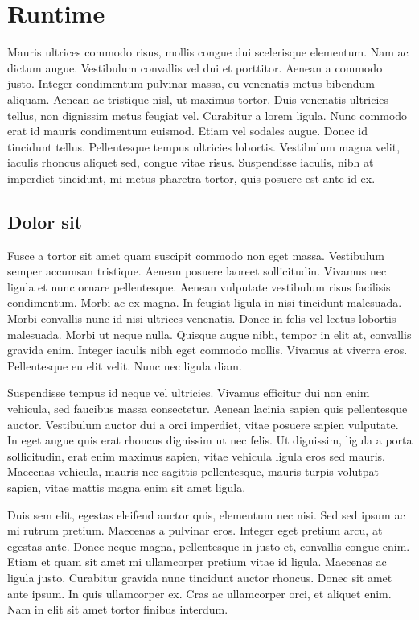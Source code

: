 \section{Runtime}
\label{sec:ipsum}
Mauris ultrices commodo risus, mollis congue dui scelerisque elementum. Nam ac dictum augue. Vestibulum convallis vel dui et porttitor. Aenean a commodo justo. Integer condimentum pulvinar massa, eu venenatis metus bibendum aliquam. Aenean ac tristique nisl, ut maximus tortor. Duis venenatis ultricies tellus, non dignissim metus feugiat vel. Curabitur a lorem ligula. Nunc commodo erat id mauris condimentum euismod. Etiam vel sodales augue. Donec id tincidunt tellus. Pellentesque tempus ultricies lobortis. Vestibulum magna velit, iaculis rhoncus aliquet sed, congue vitae risus. Suspendisse iaculis, nibh at imperdiet tincidunt, mi metus pharetra tortor, quis posuere est ante id ex.

\subsection{Dolor sit} %
\label{sub:dolor_sit}
Fusce a tortor sit amet quam suscipit commodo non eget massa. Vestibulum semper accumsan tristique. Aenean posuere laoreet sollicitudin. Vivamus nec ligula et nunc ornare pellentesque. Aenean vulputate vestibulum risus facilisis condimentum. Morbi ac ex magna. In feugiat ligula in nisi tincidunt malesuada. Morbi convallis nunc id nisi ultrices venenatis. Donec in felis vel lectus lobortis malesuada. Morbi ut neque nulla. Quisque augue nibh, tempor in elit at, convallis gravida enim. Integer iaculis nibh eget commodo mollis. Vivamus at viverra eros. Pellentesque eu elit velit. Nunc nec ligula diam.

Suspendisse tempus id neque vel ultricies. Vivamus efficitur dui non enim vehicula, sed faucibus massa consectetur. Aenean lacinia sapien quis pellentesque auctor. Vestibulum auctor dui a orci imperdiet, vitae posuere sapien vulputate. In eget augue quis erat rhoncus dignissim ut nec felis. Ut dignissim, ligula a porta sollicitudin, erat enim maximus sapien, vitae vehicula ligula eros sed mauris. Maecenas vehicula, mauris nec sagittis pellentesque, mauris turpis volutpat sapien, vitae mattis magna enim sit amet ligula.

Duis sem elit, egestas eleifend auctor quis, elementum nec nisi. Sed sed ipsum ac mi rutrum pretium. Maecenas a pulvinar eros. Integer eget pretium arcu, at egestas ante. Donec neque magna, pellentesque in justo et, convallis congue enim. Etiam et quam sit amet mi ullamcorper pretium vitae id ligula. Maecenas ac ligula justo. Curabitur gravida nunc tincidunt auctor rhoncus. Donec sit amet ante ipsum. In quis ullamcorper ex. Cras ac ullamcorper orci, et aliquet enim. Nam in elit sit amet tortor finibus interdum.

